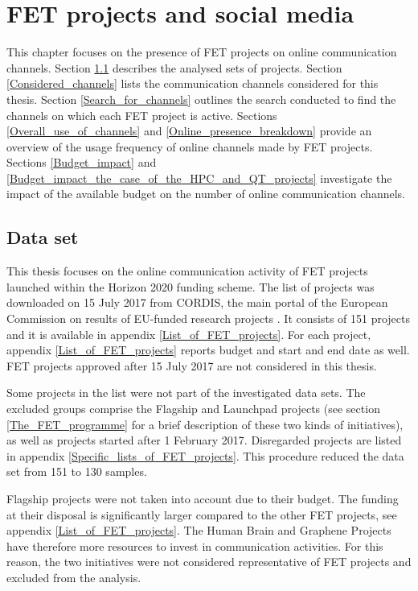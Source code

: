 \chapter{FET projects and social media} \label{FET_projects_and_social_media}
This chapter focuses on the presence of FET projects on online communication channels. Section \ref{Data_set} describes the analysed sets of projects. Section \ref{Considered_channels} lists the communication channels considered for this thesis. Section \ref{Search_for_channels} outlines the search conducted to find the channels on which each FET project is active. Sections \ref{Overall_use_of_channels} and \ref{Online_presence_breakdown} provide an overview of the usage frequency of online channels made by FET projects. Sections \ref{Budget_impact} and \ref{Budget_impact_the_case_of_the_HPC_and_QT_projects} investigate the impact of the available budget on the number of online communication channels.

\section{Data set} \label{Data_set}
This thesis focuses on the online communication activity of FET projects launched within the Horizon 2020 funding scheme. The list of projects was downloaded on 15 July 2017 from CORDIS, the main portal of the European Commission on results of EU-funded research projects \cite{CORDIS}. It consists of 151 projects and it is available in appendix \ref{List_of_FET_projects}. For each project, appendix \ref{List_of_FET_projects} reports budget and start and end date as well. FET projects approved after 15 July 2017 are not considered in this thesis.

Some projects in the list were not part of the investigated data sets. The excluded groups comprise the Flagship and Launchpad projects (see section \ref{The_FET_programme} for a brief description of these two kinds of initiatives), as well as projects started after 1 February 2017. Disregarded projects are listed in appendix \ref{Specific_lists_of_FET_projects}. This procedure reduced the data set from 151 to 130 samples.

Flagship projects were not taken into account due to their budget. The funding at their disposal is significantly larger compared to the other FET projects, see appendix \ref{List_of_FET_projects}. The Human Brain and Graphene Projects have therefore more resources to invest in communication activities. For this reason, the two initiatives were not considered representative of FET projects and excluded from the analysis. 

